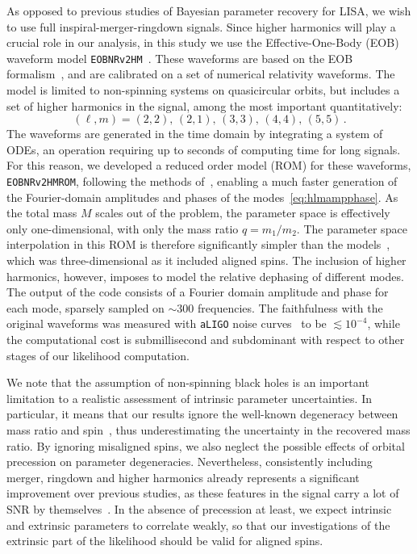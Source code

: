 \documentclass[aps,showpacs,twocolumn,prd,superscriptaddress,nofootinbib]{revtex4-1}
\newcommand{\be}{\begin{equation}}
\newcommand{\ee}{\end{equation}}
\begin{document}
As opposed to previous studies of Bayesian parameter recovery for LISA, we wish to use full inspiral-merger-ringdown signals. Since higher harmonics will play a crucial role in our analysis, in this study we use the Effective-One-Body (EOB) waveform model \texttt{EOBNRv2HM}~\cite{Pan+11}. These waveforms are based on the EOB formalism~\cite{BD99, BD00}, and are calibrated on a set of numerical relativity waveforms. The model is limited to non-spinning systems on quasicircular orbits, but includes a set of higher harmonics in the signal, among the most important quantitatively:
\be\label{eq:listmodes}
	(\ell, m) = (2,2) ,\, (2,1) ,\, (3,3) ,\, (4,4) ,\, (5,5) \,.
\ee
The waveforms are generated in the time domain by integrating a system of ODEs, an operation requiring up to seconds of computing time for long signals. For this reason, we developed a reduced order model (ROM) for these waveforms, \texttt{EOBNRv2HMROM}, following the methods of~\cite{Puerrer14}, enabling a much faster generation of the Fourier-domain amplitudes and phases of the modes~\eqref{eq:hlmampphase}. As the total mass $M$ scales out of the problem, the parameter space is effectively only one-dimensional, with only the mass ratio $q=m_{1}/m_{2}$. The parameter space interpolation in this ROM is therefore significantly simpler than the models~\cite{Puerrer14, Puerrer15, Bohe+16}, which was three-dimensional as it included aligned spins. The inclusion of higher harmonics, however, imposes to model the relative dephasing of different modes. The output of the code consists of a Fourier domain amplitude and phase for each mode, sparsely sampled on $\sim 300$ frequencies. The faithfulness with the original waveforms was measured with \texttt{aLIGO} noise curves~\cite{UnofficialNoiseCurves18} to be $\lesssim 10^{-4}$, while the computational cost is submillisecond and subdominant with respect to other stages of our likelihood computation.

We note that the assumption of non-spinning black holes is an important limitation to a realistic assessment of intrinsic parameter uncertainties. In particular, it means that our results ignore the well-known degeneracy between mass ratio and spin~\cite{CF94, PW95, Baird+2013}, thus underestimating the uncertainty in the recovered mass ratio. By ignoring misaligned spins, we also neglect the possible effects of orbital precession on parameter degeneracies. Nevertheless, consistently including merger, ringdown and higher harmonics already represents a significant improvement over previous studies, as these features in the signal carry a lot of SNR by themselves~\cite{Babak+08, Thorpe+08, McWilliams+09, McWilliams+10, McWilliams+11, Klein+15}. In the absence of precession at least, we expect intrinsic and extrinsic parameters to correlate weakly, so that  our investigations of the extrinsic part of the likelihood should be valid for aligned spins.
\end{document}
